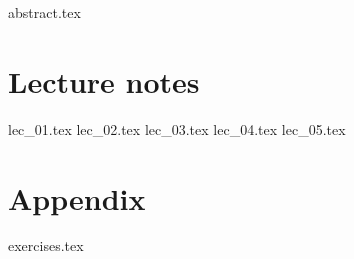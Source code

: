 \documentclass[fancyfoot, git]{mkessler-script}
\author{Simon Cyrani}
\begin{document}
\maketitle

{abstract.tex}

\cleardoublepage
\tableofcontents

\cleardoublepage
\summaryoflectures

\cleardoublepage
\part{Lecture notes}
{lec_01.tex}
{lec_02.tex}
{lec_03.tex}
{lec_04.tex}
{lec_05.tex}


\cleardoublepage
\appendix
\part{Appendix}

{exercises.tex}

\cleardoublepage

\cleardoublepage
\printvocabindex

\cleardoublepage
\printimageattributions

\cleardoublepage
\printliterature
\end{document}

